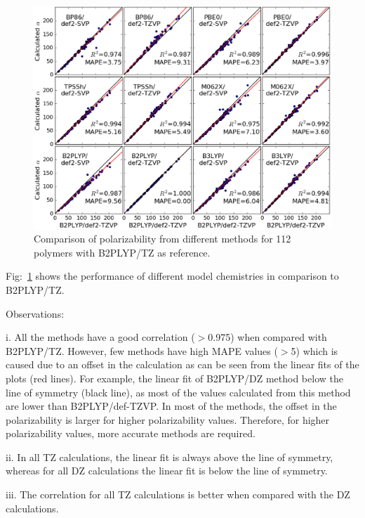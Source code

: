 \begin{figure}[htbp] 
	\centering
	\includegraphics[width=1.0\textwidth]{Chapter-3/Figures/Pol_all_methods.eps}
	\caption{Comparison of polarizability from different methods for 112 polymers with B2PLYP/TZ as reference.} 
	\label{fig:Pol_all_methods} 
\end{figure}  



Fig:\ \ref{fig:Pol_all_methods} shows the performance of different model chemistries in comparison to B2PLYP/TZ. 

Observations:

i. All the methods have a good correlation ($>$0.975) when compared with B2PLYP/TZ. However, few methods have high MAPE values ($>$5) which is caused due to an offset in the calculation as can be seen from the linear fits of the plots (red lines). For example, the linear fit of B2PLYP/DZ method below the line of symmetry (black line), as most of the values calculated from this method are lower than B2PLYP/def-TZVP. In most of the methods, the offset in the polarizability is larger for higher polarizability values. Therefore, for higher polarizability values, more accurate methods are required. 

ii. In all TZ calculations, the linear fit is always above the line of symmetry, whereas for all DZ calculations the linear fit is below the line of symmetry. 

iii. The correlation for all TZ calculations is better when compared with the DZ calculations.

